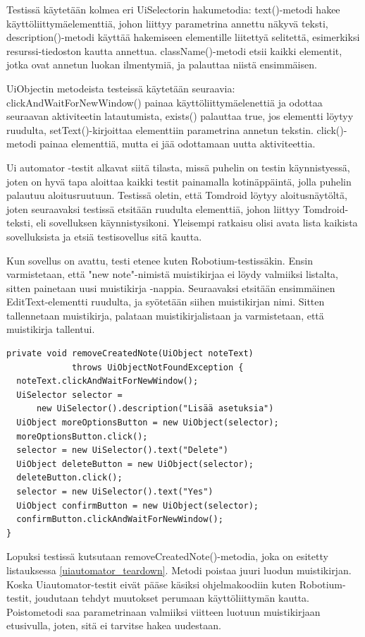 Testissä käytetään kolmea eri UiSelectorin hakumetodia: text()-metodi hakee käyttöliittymäelementtiä, johon liittyy parametrina annettu näkyvä teksti, description()-metodi käyttää hakemiseen elementille liitettyä selitettä, esimerkiksi resurssi-tiedoston kautta annettua. className()-metodi etsii kaikki elementit, jotka ovat annetun luokan ilmentymiä, ja palauttaa niistä ensimmäisen.

UiObjectin metodeista testeissä käytetään seuraavia: clickAndWaitForNewWindow() painaa käyttöliittymäelenettiä ja odottaa seuraavan aktiviteetin latautumista, exists() palauttaa true, jos elementti löytyy ruudulta, setText()-kirjoittaa elementtiin parametrina annetun tekstin. click()-metodi painaa elementtiä, mutta ei jää odottamaan uutta aktiviteettia.

Ui automator -testit alkavat siitä tilasta, missä puhelin on testin käynnistyessä, joten on hyvä tapa aloittaa kaikki testit painamalla kotinäppäintä, jolla puhelin palautuu aloitusruutuun. Testissä oletin, että Tomdroid löytyy aloitusnäytöltä, joten seuraavaksi testissä etsitään ruudulta elementtiä, johon liittyy Tomdroid-teksti, eli sovelluksen käynnistysikoni. Yleisempi ratkaisu olisi avata lista kaikista sovelluksista ja etsiä testisovellus sitä kautta.

Kun sovellus on avattu, testi etenee kuten Robotium-testissäkin. Ensin varmistetaan, että "new note"-nimistä muistikirjaa ei löydy valmiiksi listalta, sitten painetaan uusi muistikirja -nappia. Seuraavaksi etsitään ensimmäinen EditText-elementti ruudulta, ja syötetään siihen muistikirjan nimi. Sitten tallennetaan muistikirja, palataan muistikirjalistaan ja varmistetaan, että muistikirja tallentui.

\begin{lstlisting}[float,label=uiautomator_teardown,caption=Luodun muistikirjan poisto Uiautomatorilla] 
private void removeCreatedNote(UiObject noteText) 
             throws UiObjectNotFoundException {
  noteText.clickAndWaitForNewWindow();
  UiSelector selector = 
      new UiSelector().description("Lisää asetuksia")
  UiObject moreOptionsButton = new UiObject(selector);
  moreOptionsButton.click();
  selector = new UiSelector().text("Delete")
  UiObject deleteButton = new UiObject(selector);
  deleteButton.click();
  selector = new UiSelector().text("Yes")
  UiObject confirmButton = new UiObject(selector);
  confirmButton.clickAndWaitForNewWindow();
}
\end{lstlisting}

Lopuksi testissä kutsutaan removeCreatedNote()-metodia, joka on esitetty listauksessa \ref{uiautomator_teardown}. Metodi poistaa juuri luodun muistikirjan. Koska Uiautomator-testit eivät pääse käsiksi ohjelmakoodiin kuten Robotium-testit, joudutaan tehdyt muutokset perumaan käyttöliittymän kautta. Poistometodi saa parametrinaan valmiiksi viitteen luotuun muistikirjaan etusivulla, joten, sitä ei tarvitse hakea uudestaan.

